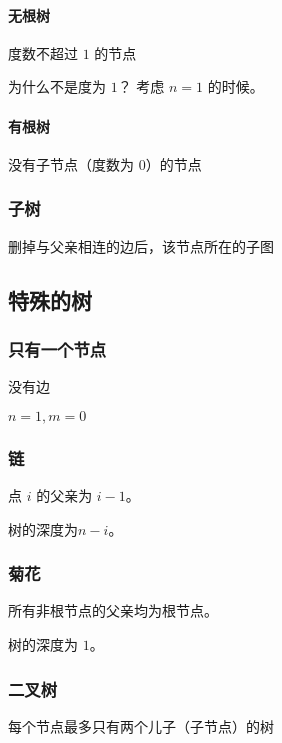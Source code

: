 \paragraph{无根树}

度数不超过 $1$ 的节点

\begin{QUESTION}{为什么不是度为 $1$？}{}
考虑 $n = 1$ 的时候。

\end{QUESTION}


\paragraph{有根树}

没有子节点（度数为 $0$）的节点

\subsubsection{子树}

删掉与父亲相连的边后，该节点所在的子图

\subsection{特殊的树}

\subsubsection{只有一个节点}

没有边

$n = 1, m = 0$

\subsubsection{链}

点 $i$ 的父亲为 $i - 1$。

树的深度为$n - i$。

\subsubsection{菊花}

所有非根节点的父亲均为根节点。

树的深度为 $1$。

\subsubsection{二叉树}

每个节点最多只有两个儿子（子节点）的树

